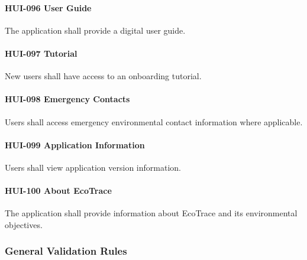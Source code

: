 \paragraph{HUI-096 User Guide}

The application shall provide a digital user guide.

\paragraph{HUI-097 Tutorial}

New users shall have access to an onboarding tutorial.

\paragraph{HUI-098 Emergency Contacts}

Users shall access emergency environmental contact information where
applicable.

\paragraph{HUI-099 Application Information}

Users shall view application version information.

\paragraph{HUI-100 About EcoTrace}

The application shall provide information about EcoTrace and its
environmental objectives.


\subsubsection*{General Validation Rules}

